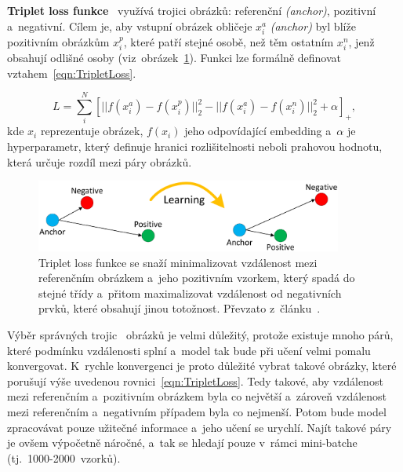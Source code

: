 \textbf{Triplet loss funkce}~\cite{website:FaceNetIntro} využívá trojici obrázků: referenční \emph{(anchor)}, pozitivní a~negativní. Cílem je, aby vstupní obrázek obličeje $x_{i}^{a}$ \emph{(anchor)} byl blíže pozitivním obrázkům $x_{i}^{p}$, které patří stejné osobě, než těm ostatním $x_{i}^{n}$, jenž obsahují odlišné osoby (viz~obrázek~\ref{img:TripletLossLearning}). Funkci lze formálně definovat vztahem~\ref{eqn:TripletLoss}.

\begin{equation}
    \label{eqn:TripletLoss}
    L = \sum_{i}^{N} \left[ ||f(x_{i}^{a}) - f(x_{i}^{p})||_{2}^{2} - ||f(x_{i}^{a}) - f(x_{i}^{n})||_{2}^{2} + \alpha \right]_{+},
\end{equation}
kde $x_i$ reprezentuje obrázek, $f(x_i)$ jeho odpovídající embedding a~$\alpha$ je hyperparametr, který definuje hranici rozlišitelnosti neboli prahovou hodnotu, která určuje rozdíl mezi páry obrázků.

\begin{figure}[hbt]
	\centering
	\setlength{\fboxsep}{0pt}
	\includegraphics[width=0.9\textwidth]{obrazky-figures/TripletLoss.pdf}
	\caption{Triplet loss funkce se snaží minimalizovat vzdálenost mezi referenčním obrázkem a~jeho pozitivním vzorkem, který spadá do stejné třídy a~přitom maximalizovat vzdálenost od negativních prvků, které obsahují jinou totožnost. Převzato z~článku~\cite{article:FaceNet}.}
	\label{img:TripletLossLearning}
\end{figure}

Výběr správných trojic~\cite{website:FaceNetIntro, website:FaceNet} obrázků je velmi důležitý, protože existuje mnoho párů, které podmínku vzdálenosti splní a~model tak bude při učení velmi pomalu konvergovat. K~rychle konvergenci je proto důležité vybrat takové obrázky, které porušují výše uvedenou rovnici~\ref{eqn:TripletLoss}. Tedy takové, aby vzdálenost mezi referenčním a~pozitivním obrázkem byla co největší a~zároveň vzdálenost mezi referenčním a~negativním případem byla co nejmenší. Potom bude model zpracovávat pouze užitečné informace a~jeho učení se urychlí. Najít takové páry je ovšem výpočetně náročné, a~tak se hledají pouze v~rámci mini-batche (tj.~1000-2000~vzorků).

